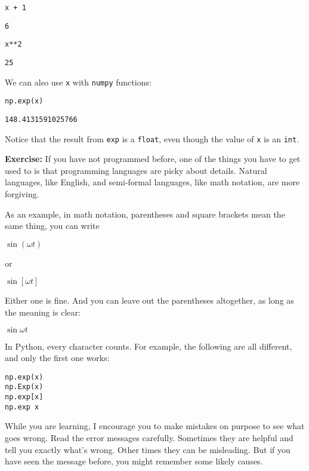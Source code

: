 \begin{lstlisting}[]
x + 1
\end{lstlisting}

\begin{lstlisting}[style=output]
6
\end{lstlisting}

\begin{lstlisting}[]
x**2
\end{lstlisting}

\begin{lstlisting}[style=output]
25
\end{lstlisting}

We can also use \passthrough{\lstinline!x!} with
\passthrough{\lstinline!numpy!} functions:

\begin{lstlisting}[]
np.exp(x)
\end{lstlisting}

\begin{lstlisting}[style=output]
148.4131591025766
\end{lstlisting}

Notice that the result from \passthrough{\lstinline!exp!} is a
\passthrough{\lstinline!float!}, even though the value of
\passthrough{\lstinline!x!} is an \passthrough{\lstinline!int!}.

\textbf{Exercise:} If you have not programmed before, one of the things
you have to get used to is that programming languages are picky about
details. Natural languages, like English, and semi-formal languages,
like math notation, are more forgiving.

As an example, in math notation, parentheses and square brackets mean
the same thing, you can write

\(\sin (\omega t)\)

or

\(\sin [\omega t]\)

Either one is fine. And you can leave out the parentheses altogether, as
long as the meaning is clear:

\(\sin \omega t\)

In Python, every character counts. For example, the following are all
different, and only the first one works:

\begin{lstlisting}[style=output]
np.exp(x)
np.Exp(x)
np.exp[x]
np.exp x
\end{lstlisting}

While you are learning, I encourage you to make mistakes on purpose to
see what goes wrong. Read the error messages carefully. Sometimes they
are helpful and tell you exactly what's wrong. Other times they can be
misleading. But if you have seen the message before, you might remember
some likely causes.

